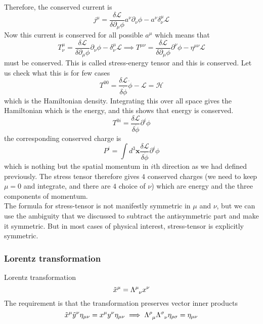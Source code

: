 \documentclass[11pt, notitlepage]{report}
\newcommand{\del}{\partial}
\newcommand{\ld}{\mathcal{L}}
\numberwithin{equation}{section}
\begin{document}
    Therefore, the conserved current is 
    \begin{equation*}
        j^\mu = \frac{\delta \ld}{\delta \del_\mu \phi}a^\nu  \del_\nu \phi  - a^\nu \delta_\nu^\mu \ld
    \end{equation*}
    Now this current is conserved for all possible \(a^\mu\) which means that 
    \begin{equation*}
        T_\nu^\mu = \frac{\delta \ld}{\delta \del_\mu \phi} \del_\nu \phi  -  \delta_\nu^\mu \ld \implies T^{\mu\nu} = \frac{\delta \ld}{\delta \del_\mu \phi} \del^\nu \phi  -  \eta^{\mu\nu} \ld
    \end{equation*}
    must be conserved. This is called stress-energy tensor and this is conserved. Let us check what this is for few cases 
    \begin{equation*}
        T^{00} = \frac{\delta \ld}{\delta \dot{\phi}}  \dot{\phi} - \ld = \mathcal{H}
    \end{equation*}
    which is the Hamiltonian density. Integrating this over all space gives the Hamiltonian which is the energy, and this shows that energy is conserved.
    \begin{equation*}
        T^{0i} = \frac{\delta \ld}{\delta \dot{\phi}} \del^i \phi
    \end{equation*}
    the corresponding conserved charge is 
    \begin{equation*}
        P^i =  \int d^3\textbf{x} \frac{\delta \ld}{\delta \dot{\phi}} \del^i \phi
    \end{equation*}
    which is nothing but the spatial momentum in \(i\)th direction as we had defined previously. The stress tensor therefore gives \(4\) conserved charges (we need to keep \(\mu = 0\) and integrate, and there are \(4\) choice of \(\nu\)) which are energy and the three components of momentum.\\ 

    The formula for stress-tensor is not manifestly symmetric in \(\mu\) and \(\nu\), but we can use the ambiguity that we discussed to subtract the antisymmetric part and make it symmetric. But in most cases of physical interest, stress-tensor is explicitly symmetric.

    \subsubsection{Lorentz transformation}
    Lorentz transformation 
    \begin{equation*}
        \tilde{x}^\mu = \Lambda\indices{^\mu_\nu} x^\nu
    \end{equation*}
    The requirement is that the transformation preserves vector inner products 
    \begin{equation*}
        \tilde{x}^\mu\tilde{y}^\nu \eta_{\mu\nu} = x^\mu y^\nu \eta_{\mu\nu} \implies \Lambda\indices{^\rho_\mu} \Lambda\indices{^\sigma_\nu} \eta_{\rho\sigma} =\eta_{\mu\nu} 
    \end{equation*}
\end{document}

